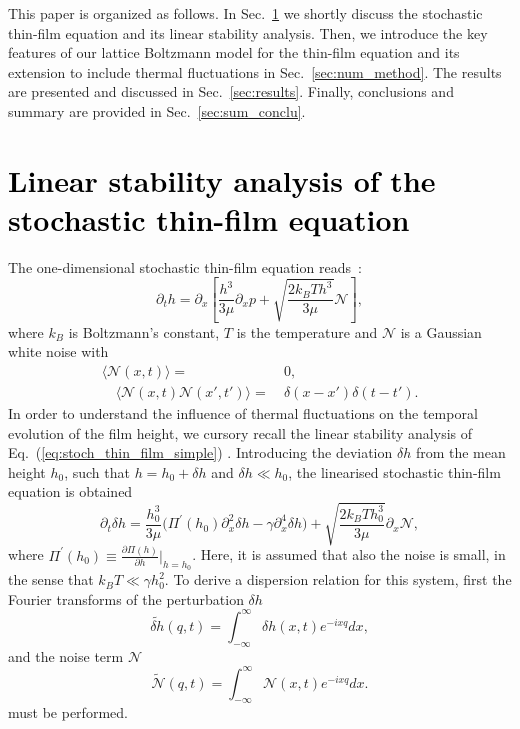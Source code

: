 This paper is organized as follows. In Sec.~\ref{sec:stoch_thin_film} we shortly discuss the stochastic thin-film equation and its linear stability analysis. Then, we introduce the key features of our lattice Boltzmann model for 
the thin-film equation and its extension to include thermal fluctuations in Sec.~\ref{sec:num_method}. 
The results are presented and discussed in Sec.~\ref{sec:results}. 
Finally, conclusions and summary are provided in Sec.~\ref{sec:sum_conclu}. 

\section{\textcolor{black}{Linear stability analysis of the stochastic thin-film equation}}\label{sec:stoch_thin_film}
The one-dimensional stochastic thin-film equation reads~\cite{Grun2006, Mecke_2005}:
\begin{equation}\label{eq:stoch_thin_film_simple}
    \partial_t h = \partial_x \left[\frac{h^3}{3\mu}\partial_x p + \sqrt{\frac{2k_BTh^3}{3\mu}}\mathcal{N}\right],
\end{equation}
where $k_B$ is Boltzmann's constant, $T$ is the temperature and $\mathcal{N}$ is a Gaussian white noise with
\begin{align}\label{eq:correlation}
    \langle\mathcal{N}(x,t)\rangle =&~0,\\ 
    \quad \langle\mathcal{N}(x,t)\mathcal{N}(x',t')\rangle =&~\delta(x-x')\delta(t-t').
\end{align}
In order to understand the influence of thermal fluctuations on the temporal evolution of the film height, we cursory recall the linear stability analysis of Eq.~(\ref{eq:stoch_thin_film_simple}) 
\cite{PhysRevE.100.023108, PhysRevE.93.013120}.
Introducing the deviation $\delta h$ from the mean height $h_0$, such that $h = h_0 + \delta h$ and $\delta h \ll h_0$, 
the linearised stochastic thin-film equation is obtained
\begin{equation}\label{eq:linearstability_realspace}
    \partial_t \delta h = \frac{h_0^3}{3\mu}\Big(\Pi^{\prime}(h_0)\partial_x^2\delta h - \gamma \partial_x^4\delta h\Big) + \sqrt{\frac{2k_BT h_0^3}{3\mu}} \partial_x \mathcal{N},
\end{equation}
where $\Pi^{\prime}(h_0) \equiv \frac{\partial \Pi(h)}{\partial h}\bigg\rvert_{h=h_0}$.
Here, it is assumed that also the noise is small, in the sense that $k_B T \ll \gamma h_0^2$.
To derive a dispersion relation for this system, first the Fourier transforms of the perturbation $\delta h$  
\begin{equation}\label{eq:fourier_delta_h}
    \tilde{\delta h}(q,t) = \int_{-\infty}^{\infty} \delta h(x,t) e^{-ixq} dx,
\end{equation}
and the noise term $\mathcal{N}$
\begin{equation}\label{eq:fourier_noise}
    \tilde{\mathcal{N}}(q,t) = \int_{-\infty}^{\infty} \mathcal{N}(x,t) e^{-ixq} dx.
\end{equation}
must be performed.

